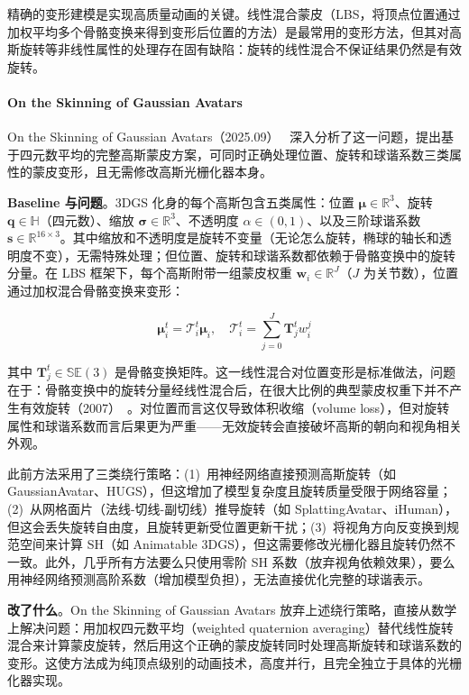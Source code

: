 精确的变形建模是实现高质量动画的关键。线性混合蒙皮（LBS，将顶点位置通过加权平均多个骨骼变换来得到变形后位置的方法）是最常用的变形方法，但其对高斯旋转等非线性属性的处理存在固有缺陷：旋转的线性混合不保证结果仍然是有效旋转。

\paragraph{On the Skinning of Gaussian Avatars}

On the Skinning of Gaussian Avatars（2025.09）~\cite{2509_11411} 深入分析了这一问题，提出基于四元数平均的完整高斯蒙皮方案，可同时正确处理位置、旋转和球谐系数三类属性的蒙皮变形，且无需修改高斯光栅化器本身。

\textbf{Baseline 与问题}。3DGS 化身的每个高斯包含五类属性：位置 $\boldsymbol{\mu} \in \mathbb{R}^3$、旋转 $\boldsymbol{q} \in \mathbb{H}$（四元数）、缩放 $\boldsymbol{\sigma} \in \mathbb{R}^3$、不透明度 $\alpha \in (0,1)$、以及三阶球谐系数 $\boldsymbol{s} \in \mathbb{R}^{16 \times 3}$。其中缩放和不透明度是旋转不变量（无论怎么旋转，椭球的轴长和透明度不变），无需特殊处理；但位置、旋转和球谐系数都依赖于骨骼变换中的旋转分量。在 LBS 框架下，每个高斯附带一组蒙皮权重 $\boldsymbol{w}_i \in \mathbb{R}^{J}$（$J$ 为关节数），位置通过加权混合骨骼变换来变形：

\[
\boldsymbol{\mu}_{i}^{t} = \mathcal{T}_{i}^{t}\boldsymbol{\mu}_{i}, \quad \mathcal{T}_{i}^{t} = \sum_{j=0}^{J} \boldsymbol{T}_{j}^{t} w_{i}^{j}
\]

其中 $\boldsymbol{T}_{j}^{t} \in \mathbb{SE}(3)$ 是骨骼变换矩阵。这一线性混合对位置变形是标准做法，问题在于：骨骼变换中的旋转分量经线性混合后，在很大比例的典型蒙皮权重下并不产生有效旋转（2007）~\cite{kavan2007skinning}。对位置而言这仅导致体积收缩（volume loss），但对旋转属性和球谐系数而言后果更为严重——无效旋转会直接破坏高斯的朝向和视角相关外观。

此前方法采用了三类绕行策略：(1)~用神经网络直接预测高斯旋转（如 GaussianAvatar、HUGS），但这增加了模型复杂度且旋转质量受限于网络容量；(2)~从网格面片（法线-切线-副切线）推导旋转（如 SplattingAvatar、iHuman），但这会丢失旋转自由度，且旋转更新受位置更新干扰；(3)~将视角方向反变换到规范空间来计算 SH（如 Animatable 3DGS），但这需要修改光栅化器且旋转仍然不一致。此外，几乎所有方法要么只使用零阶 SH 系数（放弃视角依赖效果），要么用神经网络预测高阶系数（增加模型负担），无法直接优化完整的球谐表示。

\textbf{改了什么}。On the Skinning of Gaussian Avatars 放弃上述绕行策略，直接从数学上解决问题：用加权四元数平均（weighted quaternion averaging）替代线性旋转混合来计算蒙皮旋转，然后用这个正确的蒙皮旋转同时处理高斯旋转和球谐系数的变形。这使方法成为纯顶点级别的动画技术，高度并行，且完全独立于具体的光栅化器实现。

